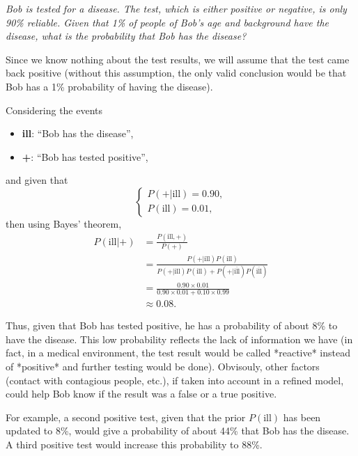 \documentclass[12pt]{article}
\begin{document}
  \begin{displayquote}
    \itshape{}
    Bob is tested for a disease. The test, which is either positive or
    negative, is only 90\% reliable. Given that 1\% of people of Bob’s age and
    background have the disease, what is the probability that Bob has the
    disease?
  \end{displayquote}

  Since we know nothing about the test results, we will assume that the test
  came back positive (without this assumption, the only valid conclusion would
  be that Bob has a 1\% probability of having the disease).

  Considering the events 
  \begin{itemize}
    \item \textbf{ill}: ``Bob has the disease'',
    \item \textbf{+}: ``Bob has tested positive'',
  \end{itemize}
  and given that 
  \begin{equation}
    \begin{cases}
      P(+ | \text{ill}) = 0.90,\\
      P(\text{ill}) = 0.01,
    \end{cases}
  \end{equation}
  then using Bayes' theorem,
  \begin{equation}
    \begin{split}
      P(\text{ill} | +) &= \frac{P(\text{ill}, +)}{P(+)}\\
      &= \frac{P(+ | \text{ill}) P(\text{ill})}{P(+ | \text{ill})P(\text{ill})
        + P(+ | \overline{\text{ill}})P(\overline{\text{ill}})}\\
      &= \frac{0.90 \times 0.01}{0.90 \times 0.01 + 0.10 \times 0.99}\\
      &\approx 0.08.
    \end{split}
  \end{equation}

  Thus, given that Bob has tested positive, he has a probability of about 8\%
  to have the disease. This low probability reflects the lack of information we
  have (in fact, in a medical environment, the test result would be called
  *reactive* instead of *positive* and further testing would be done).
  Obvisouly, other factors (contact with contagious people, etc.), if taken
  into account in a refined model, could help Bob know if the result was a
  false or a true positive.

  For example, a second positive test, given that the prior $P(\text{ill})$ has
  been updated to 8\%, would give a probability of about 44\% that Bob has the
  disease. A third positive test would increase this probability to 88\%.
\end{document}
